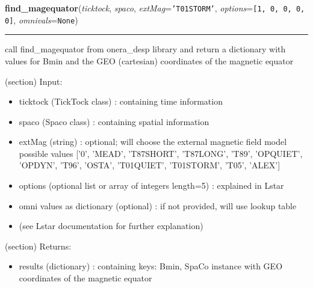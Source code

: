 \hspace{.8\funcindent}\begin{boxedminipage}{\funcwidth}

    \raggedright \textbf{find\_magequator}(\textit{ticktock}, \textit{spaco}, \textit{extMag}={\tt \texttt{'}\texttt{T01STORM}\texttt{'}}, \textit{options}={\tt \texttt{[}1\texttt{, }0\texttt{, }0\texttt{, }0\texttt{, }0\texttt{]}}, \textit{omnivals}={\tt None})

    \vspace{-1.5ex}

    \rule{\textwidth}{0.5\fboxrule}
\setlength{\parskip}{2ex}
    call find\_magequator from onera\_desp library and return a dictionary 
    with values for Bmin and the GEO (cartesian) coordinates of the 
    magnetic equator

    (section) Input:

      \begin{itemize}
      \setlength{\parskip}{0.6ex}
        \item ticktock (TickTock class) : containing time information

        \item spaco (Spaco class) : containing spatial information

        \item extMag (string) : optional; will choose the external magnetic 
          field model possible values ['0', 'MEAD', 'T87SHORT', 'T87LONG', 
          'T89', 'OPQUIET', 'OPDYN', 'T96', 'OSTA', 'T01QUIET', 'T01STORM',
          'T05', 'ALEX']

        \item options (optional list or array of integers length=5) : explained
          in Lstar

        \item omni values as dictionary (optional) : if not provided, will use 
          lookup table

        \item (see Lstar documentation for further explanation)

      \end{itemize}

    (section) Returns:

      \begin{itemize}
      \setlength{\parskip}{0.6ex}
        \item results (dictionary) : containing keys: Bmin, SpaCo instance with
          GEO coordinates of the magnetic equator


\end{itemize}
\end{boxedminipage}
